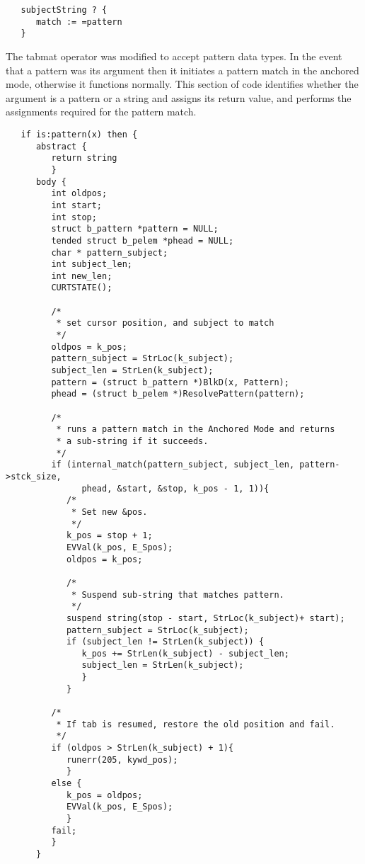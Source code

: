 \documentclass{article}
\begin{document}
\begin{verbatim}
   subjectString ? {
      match := =pattern
   }
\end{verbatim}

The tabmat operator was modified to accept pattern data types.  In the event that a pattern was its argument then it initiates a pattern match in the anchored mode, otherwise it functions normally.  This section of code identifies whether the argument is a pattern or a string and assigns its return value, and performs the assignments required for the pattern match.

\begin{verbatim}
   if is:pattern(x) then {
      abstract {
         return string
         }
      body {
         int oldpos;
         int start;
         int stop;
         struct b_pattern *pattern = NULL;
         tended struct b_pelem *phead = NULL; 
         char * pattern_subject;
         int subject_len;
         int new_len;
         CURTSTATE();
         
         /*
          * set cursor position, and subject to match
          */
         oldpos = k_pos;
         pattern_subject = StrLoc(k_subject);
         subject_len = StrLen(k_subject);
         pattern = (struct b_pattern *)BlkD(x, Pattern);
         phead = (struct b_pelem *)ResolvePattern(pattern);
         
         /*
          * runs a pattern match in the Anchored Mode and returns
          * a sub-string if it succeeds.
          */
         if (internal_match(pattern_subject, subject_len, pattern->stck_size,
               phead, &start, &stop, k_pos - 1, 1)){
            /*
             * Set new &pos.
             */ 
            k_pos = stop + 1;
            EVVal(k_pos, E_Spos);	
            oldpos = k_pos;
         
            /*
             * Suspend sub-string that matches pattern.
             */
            suspend string(stop - start, StrLoc(k_subject)+ start);
            pattern_subject = StrLoc(k_subject);
            if (subject_len != StrLen(k_subject)) {
               k_pos += StrLen(k_subject) - subject_len;
               subject_len = StrLen(k_subject);
               }
            }
            
         /*
          * If tab is resumed, restore the old position and fail.
          */
         if (oldpos > StrLen(k_subject) + 1){
            runerr(205, kywd_pos);
            } 
         else {
            k_pos = oldpos;
            EVVal(k_pos, E_Spos);
            }
         fail;
         }
      }
\end{verbatim}
\end{document}

